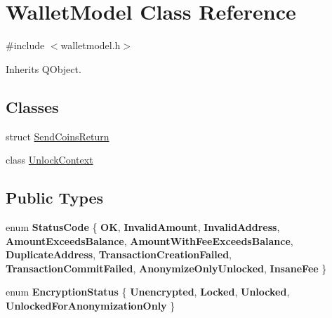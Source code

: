 \hypertarget{class_wallet_model}{}\section{Wallet\+Model Class Reference}
\label{class_wallet_model}


{\ttfamily \#include $<$walletmodel.\+h$>$}



Inherits Q\+Object.

\subsection*{Classes}
\begin{DoxyCompactItemize}
\item 
struct \mbox{\hyperlink{struct_wallet_model_1_1_send_coins_return}{Send\+Coins\+Return}}
\item 
class \mbox{\hyperlink{class_wallet_model_1_1_unlock_context}{Unlock\+Context}}
\end{DoxyCompactItemize}
\subsection*{Public Types}
\begin{DoxyCompactItemize}
\item 
\mbox{\label{class_wallet_model_afb93f64411320dce4692c2190b7d35cc}} 
enum {\bfseries Status\+Code} \{ \newline
{\bfseries OK}, 
{\bfseries Invalid\+Amount}, 
{\bfseries Invalid\+Address}, 
{\bfseries Amount\+Exceeds\+Balance}, 
\newline
{\bfseries Amount\+With\+Fee\+Exceeds\+Balance}, 
{\bfseries Duplicate\+Address}, 
{\bfseries Transaction\+Creation\+Failed}, 
{\bfseries Transaction\+Commit\+Failed}, 
\newline
{\bfseries Anonymize\+Only\+Unlocked}, 
{\bfseries Insane\+Fee}
 \}
\item 
\mbox{\label{class_wallet_model_a58f6f0bb5a7b8b4e4d0812185ccc0616}} 
enum {\bfseries Encryption\+Status} \{ {\bfseries Unencrypted}, 
{\bfseries Locked}, 
{\bfseries Unlocked}, 
{\bfseries Unlocked\+For\+Anonymization\+Only}
 \}
\end{DoxyCompactItemize}
